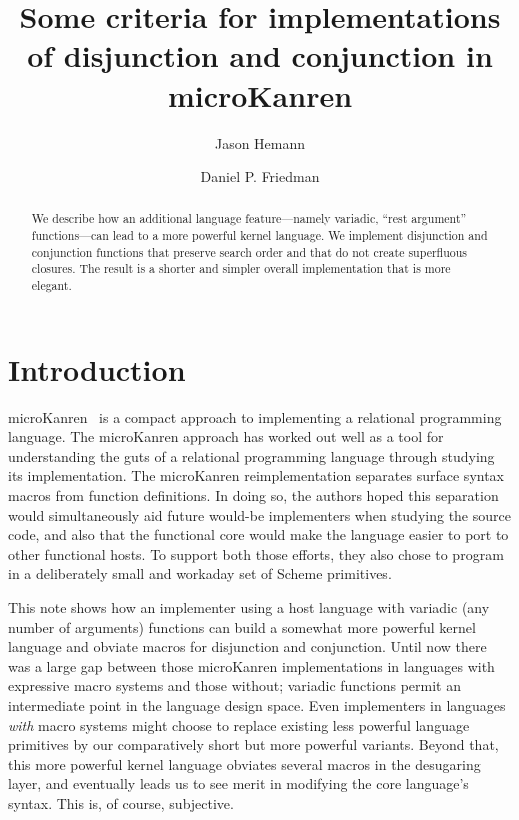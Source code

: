 \documentclass[sigplan,screen,draft,anonymous,review,natbib=false]{acmart}
\begin{document}
\title[Some criteria for implementations of conj and disj in
microKanren]{Some criteria for implementations of disjunction and
  conjunction in microKanren}

\author{Jason Hemann}
\author{Daniel P. Friedman}

\renewcommand{\shortauthors}{Hemann et al.}

\begin{abstract}
  We describe how an additional language feature---namely variadic,
  \enquote{rest argument} functions---can lead to a more powerful
  kernel language. We implement disjunction and conjunction functions
  that preserve search order and that do not create superfluous
  closures. The result is a shorter and simpler overall implementation
  that is more elegant.
\end{abstract}

\keywords{}

\maketitle

\section{Introduction}

microKanren~\cite{hemann2013muKanren} is a compact approach to
implementing a relational programming language. The microKanren
approach has worked out well as a tool for understanding the guts of a
relational programming language through studying its implementation.
The microKanren reimplementation separates surface syntax macros from
function definitions. In doing so, the authors hoped this separation
would simultaneously aid future would-be implementers when studying
the source code, and also that the functional core would make the
language easier to port to other functional hosts. To support both
those efforts, they also chose to program in a deliberately small and
workaday set of Scheme primitives.

This note shows how an implementer using a host language with variadic
(any number of arguments) functions can build a somewhat more powerful
kernel language and obviate macros for disjunction and conjunction.
Until now there was a large gap between those microKanren
implementations in languages with expressive macro systems and those
without; variadic functions permit an intermediate point in the
language design space. Even implementers in languages \emph{with}
macro systems might choose to replace existing less powerful language
primitives by our comparatively short but more powerful variants.
Beyond that, this more powerful kernel language obviates several
macros in the desugaring layer, and eventually leads us to see merit
in modifying the core language's syntax. This is, of course,
subjective.
\end{document}
